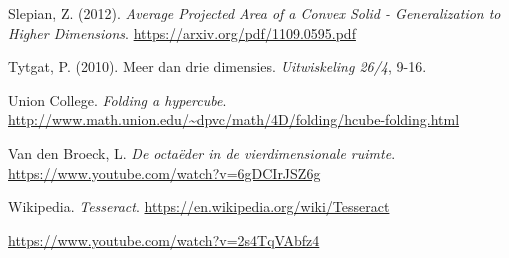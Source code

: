\begin{bronnen}
\item Slepian, Z. (2012). \emph{Average Projected Area of a Convex Solid - Generalization to Higher Dimensions}. \url{https://arxiv.org/pdf/1109.0595.pdf}



\item Tytgat, P. (2010). Meer dan drie dimensies. \emph{Uitwiskeling 26/4}, 9-16.

\item Union College. \emph{Folding a hypercube}.\\ \url{http://www.math.union.edu/~dpvc/math/4D/folding/hcube-folding.html}

\item Van den Broeck, L. \emph{De octaëder in de vierdimensionale ruimte}.\\ \url{https://www.youtube.com/watch?v=6gDCIrJSZ6g}


\item Wikipedia. \emph{Tesseract}. \url{https://en.wikipedia.org/wiki/Tesseract}

 \url{https://www.youtube.com/watch?v=2s4TqVAbfz4}
 


\end{bronnen}


\vspace{7ex}



